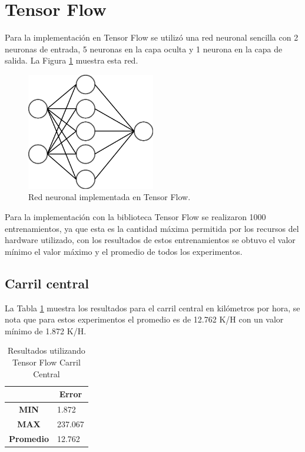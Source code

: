 \section{Tensor Flow}

Para la implementación en Tensor Flow se utilizó una red neuronal sencilla con 2 neuronas de entrada, 5 neuronas en la capa oculta y 1 neurona en la capa de salida. La Figura \ref{fig:RedTF} muestra esta red.

\begin{figure}[H]
    \centering
    \includegraphics[width=0.5\textwidth]{Resultados/imgs/RedTF.png}
    \caption{Red neuronal implementada en Tensor Flow.}
    \label{fig:RedTF}
\end{figure}

Para la implementación con la biblioteca Tensor Flow se realizaron 1000 entrenamientos, ya que esta es la cantidad máxima permitida por los recursos del hardware utilizado, con los resultados de estos entrenamientos se obtuvo el valor mínimo el valor máximo y el promedio de todos los experimentos.

\subsection{Carril central}

La Tabla \ref{tab:resultadosTFCCentral} muestra los resultados para el carril central en kilómetros por hora, se nota que para estos experimentos el promedio es de 12.762 K/H con un valor mínimo de 1.872 K/H.


\begin{table}[H]
    \centering
    \caption{Resultados utilizando Tensor Flow Carril Central}
    \label{tab:resultadosTFCCentral}
    \begin{tabular}{|c|l|} \hline

    & \multicolumn{1}{c|}{\textbf{Error}} \\ \hline
    \textbf{MIN} & 1.872 \\ \hline
    \textbf{MAX} & 237.067 \\ \hline
    \textbf{Promedio} & 12.762 \\ \hline
    \end{tabular}
\end{table}


